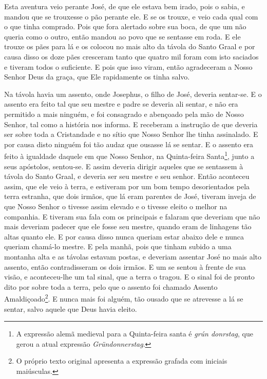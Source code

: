 Esta aventura veio perante José, de que ele estava bem irado, pois o sabia,
e mandou que se trouxesse o pão perante ele. E se os trouxe, e veio cada qual
com o que tinha comprado. Pois que fora alertado sobre sua boca, de que um não
queria como o outro, então mandou ao povo que se sentasse em roda. E ele trouxe
os pães para lá e os colocou no mais alto da távola do Santo Graal e por causa
disso os doze pães cresceram tanto que quatro mil foram com isto saciados e
tiveram todos o suficiente. E pois que isso viram, então agradeceram a Nosso
Senhor Deus da graça, que Ele rapidamente os tinha salvo.

Na távola havia um assento, onde Josephus, o filho de José, deveria
sentar-se. E o assento era feito tal que seu mestre e padre se deveria ali
sentar, e não era permitido a mais ninguém, e foi consagrado e abençoado pela
mão de Nosso Senhor, tal como a história nos informa. E receberam a instrução
de que deveria ser sobre toda a Cristandade e no sítio que Nosso Senhor lhe
tinha assinalado. E por causa disto ninguém foi tão audaz que ousasse lá se
sentar. E o assento era feito à igualdade daquele em que Nosso Senhor, na
Quinta-feira Santa\footnote{ A expressão alemã medieval para a Quinta-feira
santa é \textit{grún donrstag},  que gerou
a atual expressão \textit{Gründonnerstag}.},  junto a seus
apóstolos, sentou-se. E assim deveria dirigir aqueles que se sentassem à távola
do Santo Graal, e deveria ser seu mestre e seu senhor. Então aconteceu assim,
que ele veio à terra, e estiveram por um bom tempo desorientados pela terra
estranha, que dois irmãos, que lá eram parentes de José, tiveram inveja de que
Nosso Senhor o tivesse assim elevado e o tivesse eleito o melhor na companhia.
E tiveram sua fala com os principais e falaram que deveriam que não mais
deveriam padecer que ele fosse seu mestre, quando eram de linhagens tão altas
quanto ele. E por causa disso nunca queriam estar abaixo dele e nunca queriam
chamá-lo mestre. E pela manhã, pois que tinham subido a uma montanha alta e as
távolas estavam postas, e deveriam assentar José no mais alto assento, então
contradisseram os dois irmãos. E um se sentou à frente de sua visão, e
aconteceu-lhe um tal sinal, que a terra o tragou. E o sinal foi de pronto dito
por sobre toda a terra, pelo que o assento foi chamado Assento
Amaldiçoado\footnote{ O próprio texto original apresenta a expressão grafada
com iniciais maiúsculas.}. E nunca mais foi alguém, tão ousado que
se atrevesse a lá se sentar, salvo aquele que Deus havia eleito. 

